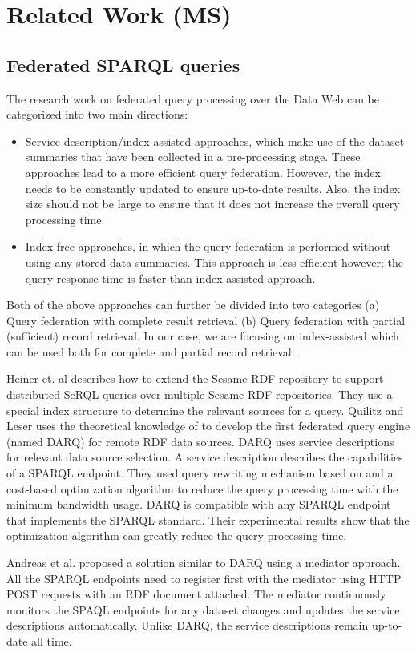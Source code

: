 \documentclass{sig-alternate}  %
\begin{document}
\section{Related Work (MS)}
\subsection{Federated SPARQL queries}
The research work on federated query processing over the Data Web
can be categorized into two main directions: 
\begin{itemize}
\item Service description/index-assisted approaches, which make use of the
dataset summaries that have been collected in a pre-processing stage.
These approaches lead to a more efficient query federation. However,
the index needs to be constantly updated to ensure up-to-date results.
Also, the index size should not be large to ensure that it does not
increase the overall query processing time. 
\item Index-free approaches, in which the query federation is performed
without using any stored data summaries. This approach is less efficient
however; the query response time is faster than index assisted approach. 
\end{itemize}
Both of the above approaches can further be divided into two categories
(a) Query federation with complete result retrieval (b) Query federation
with partial (sufficient) record retrieval. In our case, we are focusing
on index-assisted which can be used both for complete and partial record retrieval .

Heiner et. al\cite{key-1} describes how to extend the Sesame RDF
repository to support distributed SeRQL queries over multiple Sesame
RDF repositories. They use a special index structure to determine
the relevant sources for a query. Quilitz and Leser\cite{key-2}
uses the theoretical knowledge of\cite{key-1} to develop the first federated
query engine (named DARQ) for remote RDF data sources. DARQ uses service
descriptions for relevant data source selection. A service description
describes the capabilities of a SPARQL endpoint. They used query rewriting
mechanism based on\cite{key-8} and a cost-based optimization algorithm
to reduce the query processing time with the minimum bandwidth usage.
DARQ is compatible with any SPARQL endpoint that implements the SPARQL
standard. Their experimental results show that the optimization algorithm
can greatly reduce the query processing time.

Andreas et al.\cite{key-3} proposed a solution similar to DARQ using a
mediator approach. All the SPARQL endpoints need to register first
with the mediator using HTTP POST requests with an RDF document attached.
The mediator continuously monitors the SPAQL endpoints for any dataset
changes and updates the service descriptions automatically. Unlike
DARQ, the service descriptions remain up-to-date all time. 
\end{document}
